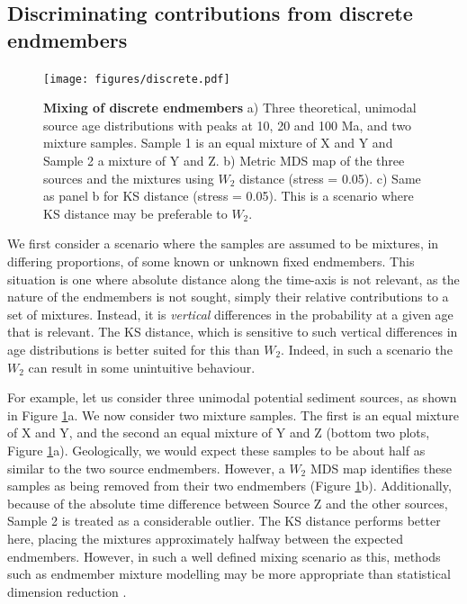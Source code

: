 \documentclass[gchron, manuscript]{article}
\begin{document}
\subsection{Discriminating contributions from discrete endmembers}

\begin{figure}
    \centering
    \texttt{[image: figures/discrete.pdf]}
    \caption{\textbf{Mixing of discrete endmembers} a) Three theoretical, unimodal source age distributions with peaks at 10, 20 and 100 Ma, and two mixture samples. Sample 1 is an equal mixture of X and Y and Sample 2 a mixture of Y and Z. b) Metric MDS map of the three sources and the mixtures using $W_2$ distance (stress = 0.05). c) Same as panel b for KS distance (stress = 0.05). This is a scenario where KS distance may be preferable to $W_2$.}
    \label{fig:discrete}
\end{figure}

We first consider a scenario where the samples are assumed to be mixtures, in differing proportions, of some known or unknown fixed endmembers. This situation is one where absolute distance along the time-axis is not relevant, as the nature of the endmembers is not sought, simply their relative contributions to a set of mixtures. Instead, it is \textit{vertical} differences in the probability at a given age that is relevant. The KS distance, which is sensitive to such vertical differences in age distributions is better suited for this than $W_2$. Indeed, in such a scenario the $W_2$ can result in some unintuitive behaviour. 

For example, let us consider three unimodal potential sediment sources, as shown in Figure \ref{fig:discrete}a. We now consider two mixture samples. The first is an equal mixture of X and Y, and the second an equal mixture of Y and Z (bottom two plots, Figure \ref{fig:discrete}a). Geologically, we would expect these samples to be about half as similar to the two source endmembers. However, a $W_2$ MDS map identifies these samples as being removed from their two endmembers (Figure \ref{fig:discrete}b). Additionally, because of the absolute time difference between Source Z and the other sources, Sample 2 is treated as a considerable outlier. The KS distance performs better here, placing the mixtures approximately halfway between the expected endmembers. However, in such a well defined mixing scenario as this, methods such as endmember mixture modelling may be more appropriate than statistical dimension reduction \citealt[e.g.,][]{weltje_end-member_1997,sharman_sediment_2017,dietze_grain-size_2019}.
\end{document}
